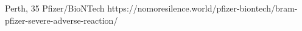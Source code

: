           {Perth, }
          {35}
          {Pfizer/BioNTech}
          {}
          {
          }
          {https://nomoresilence.world/pfizer-biontech/bram-pfizer-severe-adverse-reaction/}


